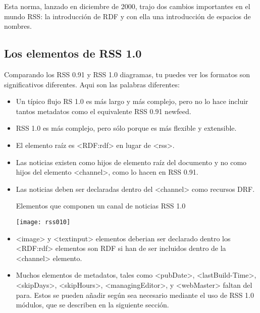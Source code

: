 Esta norma, lanzado en diciembre de 2000, trajo dos cambios importantes en el mundo RSS: la introducci\'{o}n
de RDF y con ella una introducci\'{o}n de espacios de nombres.\cite{hammersley2005developing}
 
\subsection{Los elementos de RSS 1.0}

Comparando los RSS 0.91 y RSS 1.0 diagramas, tu puedes ver los formatos son significativos diferentes.
Aqui son las palabras diferentes:

\begin{itemize}

\item Un típico flujo RS 1.0 es más largo y más complejo, pero no lo hace incluir tantos metadatos como el
equivalente RSS 0.91 newfeed.

\item RSS 1.0 es más complejo, pero sólo porque es más flexible y extensible.

\item El elemento raíz es <RDF:rdf> en lugar de <rss>.

\item Las noticias existen como hijos de elemento raíz del documento y no como hijos del elemento <channel>,
como lo hacen en RSS 0.91.

\item Las noticias deben ser declaradas dentro del <channel> como recursos DRF. \par

\begin{center}

Elementos que componen un canal de noticias RSS 1.0

\end{center}

\begin{minipage}{1.0\linewidth}
	\centering
	\texttt{[image: rss010]}
\end{minipage}

\item <image> y <textinput> elementos deberian ser declarado dentro los <RDF:rdf> elementos son RDF
si han de ser incluidos dentro de la <channel> elemento.

\item Muchos elementos de metadatos, tales como  <pubDate>, <lastBuild-Time>, <skipDays>,
<skipHours>, <managingEditor>, y <webMaster> faltan del para. Estos se pueden añadir según sea necesario
mediante el uso de RSS 1.0 módulos, que se describen en la siguiente sección.\cite{johnson2006rss}

\end{itemize}

